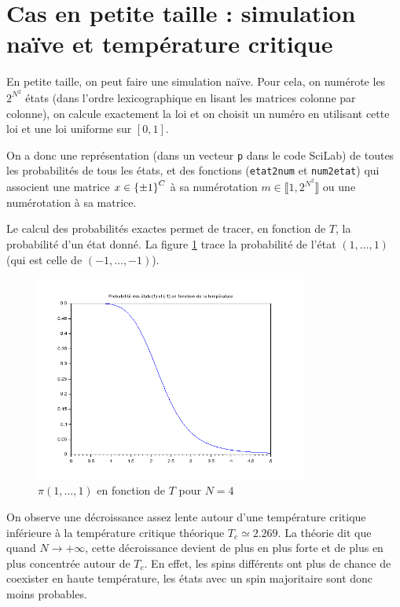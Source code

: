 \documentclass[a4paper,11pt]{article}
\begin{document}
\section{Cas en petite taille : simulation naïve et température critique}\label{sec:naive}

En petite taille, on peut faire une simulation naïve. Pour cela, on numérote les $2^{N^2}$ états (dans l'ordre lexicographique en lisant les matrices colonne par colonne), on calcule exactement la loi et on choisit un numéro en utilisant cette loi et une loi uniforme sur $[0,1]$.

On a donc une représentation (dans un vecteur \texttt{p} dans le code SciLab) de toutes les probabilités de tous les états, et des fonctions (\texttt{etat2num} et \texttt{num2etat}) qui associent une matrice $x \in \left\lbrace \pm 1 \right\rbrace^C$ à sa numérotation $m \in \llbracket 1,2^{N^2} \rrbracket$ ou une numérotation à sa matrice.

Le calcul des probabilités exactes permet de tracer, en fonction de $T$, la probabilité d'un état donné. La figure \ref{fig:tc_naive_N4} trace la probabilité de l'état $(1,\hdots,1)$ (qui est celle de $(-1,\hdots,-1)$).
\begin{figure}[!htbp]
	\centering
	\includegraphics[width=0.8\textwidth]{temperature_critique_naive_N4.png}
	\caption{$\pi(1,\hdots,1)$ en fonction de $T$ pour $N = 4$}
	\label{fig:tc_naive_N4}
\end{figure}
On observe une décroissance assez lente autour d'une température critique inférieure à la température critique théorique $T_c \simeq 2.269$. La théorie dit que quand $N \rightarrow +\infty$, cette décroissance devient de plus en plus forte et de plus en plus concentrée autour de $T_c$. En effet, les spins différents ont plus de chance de coexister en haute température, les états avec un spin majoritaire sont donc moins probables.
\end{document}
